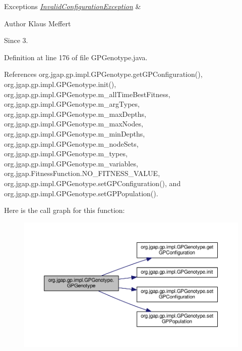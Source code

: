 \begin{DoxyExceptions}{Exceptions}
{\em \hyperlink{classorg_1_1jgap_1_1_invalid_configuration_exception}{Invalid\-Configuration\-Exception}} & \\
\hline
\end{DoxyExceptions}
\begin{DoxyAuthor}{Author}
Klaus Meffert 
\end{DoxyAuthor}
\begin{DoxySince}{Since}
3. 
\end{DoxySince}


Definition at line 176 of file G\-P\-Genotype.\-java.



References org.\-jgap.\-gp.\-impl.\-G\-P\-Genotype.\-get\-G\-P\-Configuration(), org.\-jgap.\-gp.\-impl.\-G\-P\-Genotype.\-init(), org.\-jgap.\-gp.\-impl.\-G\-P\-Genotype.\-m\-\_\-all\-Time\-Best\-Fitness, org.\-jgap.\-gp.\-impl.\-G\-P\-Genotype.\-m\-\_\-arg\-Types, org.\-jgap.\-gp.\-impl.\-G\-P\-Genotype.\-m\-\_\-max\-Depths, org.\-jgap.\-gp.\-impl.\-G\-P\-Genotype.\-m\-\_\-max\-Nodes, org.\-jgap.\-gp.\-impl.\-G\-P\-Genotype.\-m\-\_\-min\-Depths, org.\-jgap.\-gp.\-impl.\-G\-P\-Genotype.\-m\-\_\-node\-Sets, org.\-jgap.\-gp.\-impl.\-G\-P\-Genotype.\-m\-\_\-types, org.\-jgap.\-gp.\-impl.\-G\-P\-Genotype.\-m\-\_\-variables, org.\-jgap.\-Fitness\-Function.\-N\-O\-\_\-\-F\-I\-T\-N\-E\-S\-S\-\_\-\-V\-A\-L\-U\-E, org.\-jgap.\-gp.\-impl.\-G\-P\-Genotype.\-set\-G\-P\-Configuration(), and org.\-jgap.\-gp.\-impl.\-G\-P\-Genotype.\-set\-G\-P\-Population().



Here is the call graph for this function\-:
\nopagebreak
\begin{figure}[H]
\begin{center}
\leavevmode
\includegraphics[width=350pt]{classorg_1_1jgap_1_1gp_1_1impl_1_1_g_p_genotype_a71854e2aa9fc4e178a0c768efe9c80ad_cgraph}
\end{center}
\end{figure}




